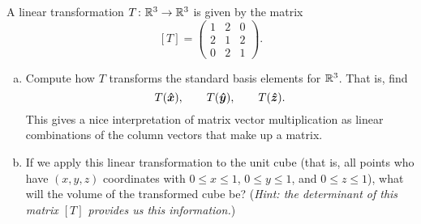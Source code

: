 \documentclass[12pt]{article} %
\begin{document}
\newpage
\begin{problem}
A linear transformation $T\colon \mathbb{R}^3 \to \mathbb{R}^3$ is given by the matrix
\[
[T]= \begin{pmatrix}
1& 2& 0\\
2& 1& 2\\
0& 2& 1
\end{pmatrix}.
\]
\begin{enumerate}[(a)]
    \item Compute how $T$ transforms the standard basis elements for $\mathbb{R}^3$. That is, find
    \[
    T(\boldsymbol{\hat{x}}), \qquad
    T(\boldsymbol{\hat{y}}), \qquad 
    T(\boldsymbol{\hat{z}}).
    \]
    This gives a nice interpretation of matrix vector multiplication as linear combinations of the column vectors that make up a matrix.
    \item If we apply this linear transformation to the unit cube (that is, all points who have $(x,y,z)$ coordinates with $0\leq x \leq 1$, $0\leq y \leq 1$, and $0\leq z \leq 1$), what will the volume of the transformed cube be? (\emph{Hint: the determinant of this matrix $[T]$ provides us this information.})
\end{enumerate}
\end{problem}
\end{document}
